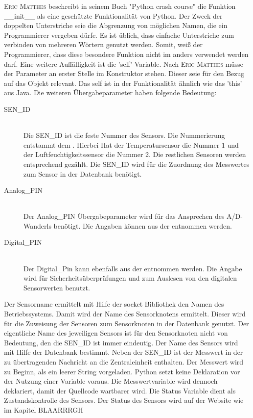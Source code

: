 	\textsc{Eric Matthes} beschreibt in seinem Buch "Python crash course"\cite{1593276036} die Funktion \_\_init\_\_ als eine geschützte Funktionalität von Python. Der Zweck der doppelten Unterstriche seie die Abgrenzung von möglichen Namen, die ein Programmierer vergeben dürfe. Es ist üblich, dass einfache Unterstriche zum verbinden von mehreren Wörtern genutzt werden. Somit, weiß der Programmierer, dass diese besondere Funktion nicht im anders verwendet werden darf. Eine weitere Auffälligkeit ist die 'self' Variable. Nach \textsc{Eric Matthes} müsse der Parameter an erster Stelle im Konstruktor stehen. Dieser seie für den Bezug auf das Objekt relevant. Das self ist in der Funktionalität ähnlich wie das 'this' aus Java. Die weiteren Übergabeparameter haben folgende Bedeutung:
	\begin{description}
		\item[SEN\_ID] \hfill \\
			Die SEN\_ID ist die feste Nummer des Sensors. Die Nummerierung entstammt dem . Hierbei Hat der Temperatursensor die Nummer 1 und der Luftfeuchtigkeitssensor die Nummer 2. Die restlichen Sensoren werden entsprechend gezählt. Die SEN\_ID wird für die Zuordnung des Messwertes zum Sensor in der Datenbank benötigt. 
		\item[Analog\_PIN] \hfill \\
			Der Analog\_PIN Übergabeparameter wird für das Ansprechen des A/D-Wanderls benötigt. Die Angaben können aus der  entnommen werden.
		\item[Digital\_PIN] \hfill \\
			Der Digital\_Pin kann ebenfalls aus der  entnommen werden. Die Angabe wird für Sicherheitsüberprüfungen und zum Auslesen von den digitalen Sensorwerten benutzt.
   	\end{description}
	Der Sensorname ermittelt mit Hilfe der socket Bibliothek den Namen des Betriebssystems. Damit wird der Name des Sensorknotens ermittelt. Dieser wird für die Zuweisung der Sensoren zum Sensorknoten in der Datenbank genutzt. Der eigentliche Name des jeweiligen Sensors ist für den Sensorknoten nicht von Bedeutung, den die SEN\_ID ist immer eindeutig. Der Name des Sensors wird mit Hilfe der Datenbank bestimmt.
	Neben der SEN\_ID ist der Messwert in der zu übertragenden Nachricht an die Zentraleinheit enthalten. Der Messwert wird zu Beginn, als ein leerer String vorgeladen. Python setzt keine Deklaration vor der Nutzung einer Variable voraus. Die Messwertvariable wird dennoch deklariert, damit der Quellcode wartbarer wird. Die Status Variable dient als Zustandskontrolle des Sensors. Der Status des Sensors wird auf der Website wie im Kapitel BLAARRRGH %
